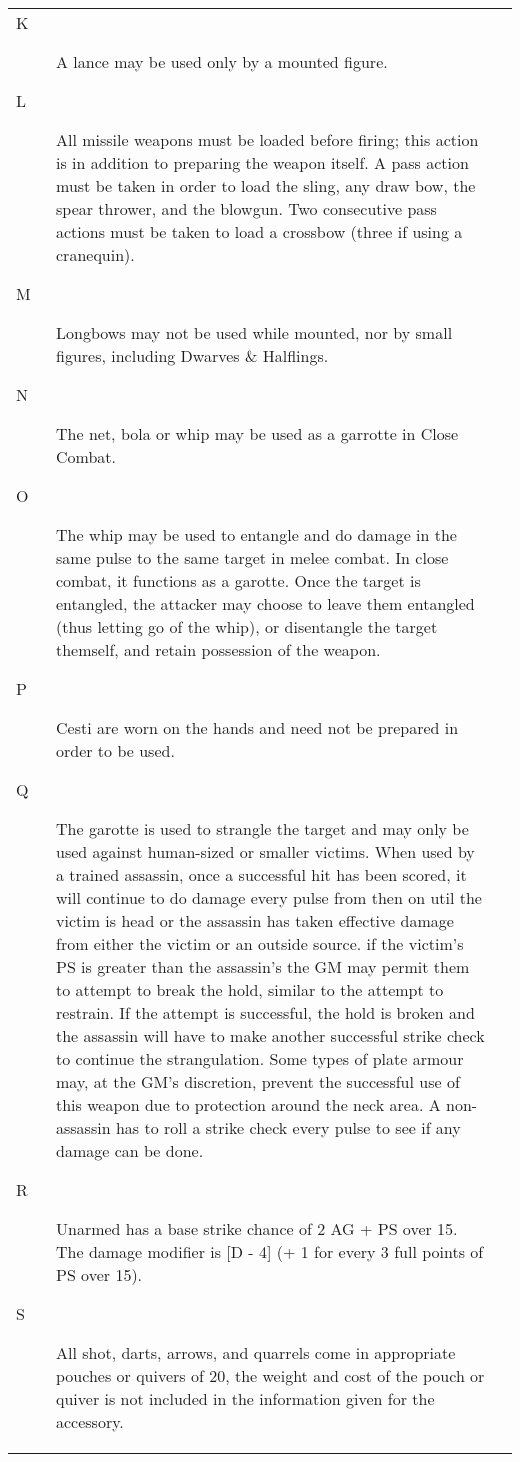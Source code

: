 \begin{tabular}[t]{l|r}
\begin{minipage}[t]{2.2in}
{\begin{description}
\item[K] A lance may be used only by a mounted figure.

\item[L] All missile weapons must be loaded before firing; this action
is in addition to preparing the weapon itself.  A pass action must be
taken in order to load the sling, any draw bow, the spear thrower,
and the blowgun.  Two consecutive pass actions must be taken to load a
crossbow (three if using a cranequin).

\item[M] Longbows may not be used while mounted, nor by small figures,
including Dwarves \& Halflings.

\item[N] The net, bola or whip may be used as a garrotte in Close Combat.

\item[O] The whip may be used to entangle and do damage in the same
pulse to the same target in melee combat.  In close combat, it
functions as a garotte.  Once the target is entangled, the attacker may
choose to leave them entangled (thus letting go of the whip), or
disentangle the target themself, and retain possession of the weapon.

\item[P] Cesti are worn on the hands and need not be prepared in order
to be used.

\item[Q] The garotte is used to strangle the target and may only be
used against human-sized or smaller victims.  When used by a trained
assassin, once a successful hit has been scored, it will continue to
do damage every pulse from then on util the victim is head or the
assassin has taken effective damage from either the victim or an
outside source.  if the victim's PS is greater than the assassin's the
GM may permit them to attempt to break the hold, similar to the
attempt to restrain.  If the attempt is successful, the hold is broken
and the assassin will have to make another successful strike check to
continue the strangulation.  Some types of plate armour may, at the
GM's discretion, prevent the successful use of this weapon due to
protection around the neck area.  A non-assassin has to roll a strike
check every pulse to see if any damage can be done.

\item[R] Unarmed has a base strike chance of 2 \x AG + PS over 15.
The damage modifier is [D - 4] (+ 1 for every 3 full points of PS over
15).

\item[S] All shot, darts, arrows, and quarrels come in appropriate
pouches or quivers of 20, the weight and cost of the pouch or quiver
is not included in the information given for the accessory.

\end{description}}
\end{minipage}
\end{tabular}

